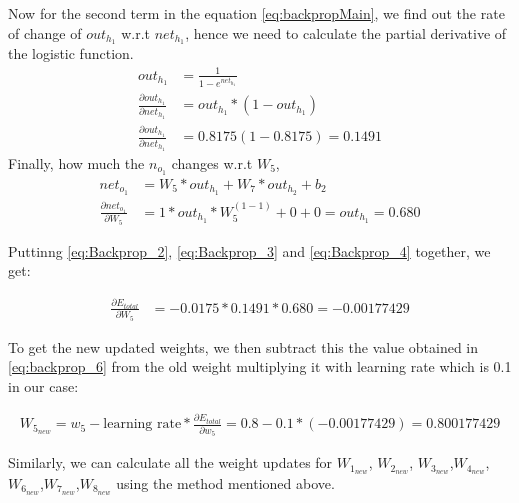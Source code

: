 Now for the second term in the equation \ref{eq:backpropMain}, we find out the rate of change of $out_{h_{1}}$ w.r.t $net_{h_{1}}$, hence we need to calculate the partial derivative of the logistic function. 
\begin{align}
    out_{h_{1}} &= \frac{1}{1-e^{net_{h_{1}}}}\\
    \frac{\partial out_{h_{1}}}{\partial net_{h_{1}}} &=  out_{h_{1}}*(1-out_{h_{1}}) \\
    \frac{\partial out_{h_{1}}}{\partial net_{h_{1}}} &= 0.8175(1-0.8175) = 0.1491 \label{eq:Backprop_3}
\end{align}
Finally, how much the $n_{o_{1}}$ changes w.r.t $W_{5}$,
\begin{align}
    net_{o_{1}} &= W_{5} * out_{h_{1}} + W_{7} * out_{h_{2}} + b_{2}   \\
    \frac{\partial net_{o_{1}}}{\partial W_{5}} &=  1 * out_{h_{1}} * W_{5}^{(1 - 1)} + 0 + 0 = out_{h_{1}} = 0.680 \label{eq:Backprop_4}
\end{align}

Puttinng \ref{eq:Backprop_2}, \ref{eq:Backprop_3} and \ref{eq:Backprop_4} together, we get:

\begin{align}
    \frac{\partial E_{total} }{\partial W_{5}} &= -0.0175 * 0.1491 * 0.680 = -0.00177429 \label{eq:backprop_6}
\end{align}

To get the new updated weights, we then subtract this the value obtained in \ref{eq:backprop_6} from the old weight multiplying it with learning rate which is 0.1 in our case:

\begin{align}
    W_{5_{new}} = w_5 - \text{learning rate}* \frac{\partial E_{total}}{\partial w_{5}} = 0.8 - 0.1 * (-0.00177429)= 0.800177429
\end{align}

Similarly, we can calculate all the weight updates for $W_{1_{new}}$, $W_{2_{new}}$, $W_{3_{new}}$,$W_{4_{new}}$,\\$W_{6_{new}}$,$W_{7_{new}}$,$W_{8_{new}}$ using the method mentioned above.


